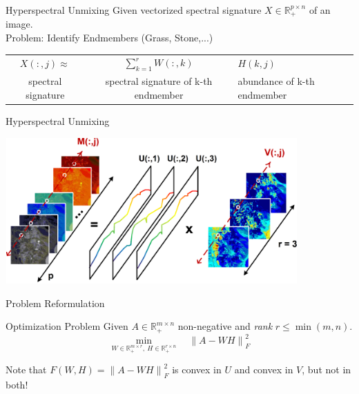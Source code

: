 \documentclass[aspectratio=169]{beamer}
\begin{document}
\begin{frame}{Hyperspectral Unmixing}
    Given vectorized spectral signature \(X \in \mathbb{R}^{p \times n}_+\) of an image. \\
    Problem: Identify Endmembers (Grass, Stone,...)

    \begin{center}
    \begin{tabular}{ c c l }
     \(X(:,j) \approx \) &  \(\sum_{k=1}^{r} W(:,k) \) & \(H(k,j)\) \\ 
     spectral signature & spectral signature of k-th endmember & abundance of k-th endmember
    \end{tabular}
    \end{center}
      
\end{frame}


\begin{frame}{Hyperspectral Unmixing}
    \begin{center}
        \includegraphics[height = 2.2in, width = 4.4in]{hyperspec.png} \\
    \end{center}
\end{frame}

\begin{frame}{Problem Reformulation}
    \begin{block}{Optimization Problem}
            Given \(A \in \mathbb{R}^{m \times n}_+\) non-negative and \emph{rank} \(r \leq \min(m, n)\). \\
            \[ \min_{W \in \mathbb{R}^{m \times r}_+, \ H \in \mathbb{R}^{r \times n}_+ } \quad  {\| A - WH \|}_F^2 \]
    \end{block}
    Note that $F(W,H) = {\|A - WH\|}_F^2$ is convex in $U$ and convex in $V$, but not in both!
\end{frame}
\end{document}

